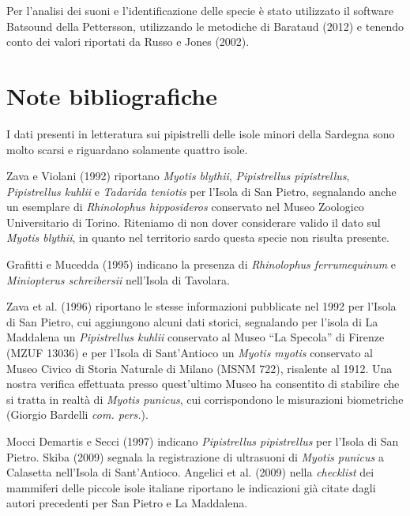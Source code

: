 \begin{multicols}{2}
Per l’analisi dei suoni e l’identificazione delle specie è stato utilizzato il software Batsound della Pettersson, utilizzando le metodiche di Barataud (2012) e tenendo conto dei valori riportati da Russo e Jones (2002).

\section*{Note bibliografiche}
I dati presenti in letteratura sui pipistrelli delle isole minori della Sardegna sono molto scarsi e riguardano solamente quattro isole. 

Zava e Violani (1992) riportano \emph{Myotis blythii}, \emph{Pipistrellus pipistrellus}, \emph{Pipistrellus kuhlii} e \emph{Tadarida teniotis} per l’Isola di San Pietro, segnalando anche un esemplare di \emph{Rhinolophus hipposideros} conservato nel Museo Zoologico Universitario di Torino. Riteniamo di non dover considerare valido il dato sul \emph{Myotis blythii}, in quanto nel territorio sardo questa specie non risulta presente.

Grafitti e Mucedda (1995) indicano la presenza di \emph{Rhinolophus ferrumequinum} e \emph{Miniopterus schreibersii} nell’Isola di Tavolara.

Zava et al. (1996) riportano le stesse informazioni pubblicate nel 1992 per l’Isola di San Pietro, cui aggiungono alcuni dati storici, segnalando per l'isola di La Maddalena un \emph{Pipistrellus kuhlii} conservato al Museo ``La Specola'' di Firenze (MZUF 13036) e per l'Isola di Sant'Antioco un \emph{Myotis myotis} conservato al Museo Civico di Storia Naturale di Milano (MSNM 722), risalente al 1912. Una nostra verifica effettuata presso quest’ultimo Museo ha consentito di stabilire che si tratta in realtà di \emph{Myotis punicus}, cui corrispondono le misurazioni biometriche (Giorgio Bardelli \textit{com. pers.}).

Mocci Demartis e Secci (1997) indicano \emph{Pipistrellus pipistrellus} per l’Isola di San Pietro.
Skiba (2009) segnala la registrazione di ultrasuoni di \emph{Myotis punicus} a Calasetta nell’Isola di Sant’Antioco.
Angelici et al. (2009) nella \textit{checklist} dei mammiferi delle piccole isole italiane riportano le indicazioni già citate dagli autori precedenti per San Pietro e La Maddalena. 


\end{multicols}
